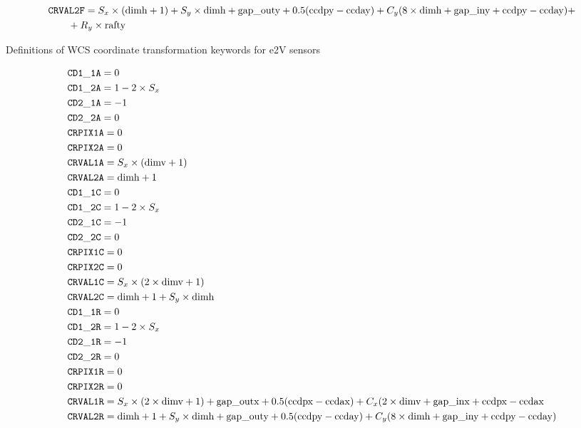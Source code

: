 \documentclass{article}[12pt]
\begin{document}
\begin{table}
\begin{align*}
& {\tt CRVAL2F} = S_x \times ({\rm dimh} + 1) + S_y \times {\rm dimh} +  {\rm gap\_outy} + 0.5({\rm ccdpy} -  {\rm ccday}) + C_y ( 8 \times {\rm dimh} + {\rm gap\_iny} + {\rm ccdpy} - {\rm ccday}) + \\  &\qquad {} + R_y \times {\rm rafty}  \\
\end{align*}
\caption{Definitions of WCS coordinate transformation keywords for e2V sensors\label{tab:e2vwcs}}
\end{table}

\begin{table}
\begin{align*}
& {\tt CD1\_1A} = 0 \\
& {\tt CD1\_2A} = 1 - 2 \times S_x \\
& {\tt CD2\_1A} = -1 \\
& {\tt CD2\_2A} = 0 \\
& {\tt CRPIX1A} = 0 \\
& {\tt CRPIX2A} = 0 \\
& {\tt CRVAL1A} = S_x \times({\rm dimv} + 1) \\
& {\tt CRVAL2A} = {\rm dimh} + 1 \\
& {\tt CD1\_1C} = 0 \\
& {\tt CD1\_2C} = 1 - 2 \times S_x \\
& {\tt CD2\_1C} = -1 \\
& {\tt CD2\_2C} = 0 \\
& {\tt CRPIX1C} = 0 \\
& {\tt CRPIX2C} = 0 \\
& {\tt CRVAL1C} = S_x \times(2 \times {\rm dimv} + 1) \\
& {\tt CRVAL2C} = {\rm dimh} + 1 + S_y \times {\rm dimh} \\
& {\tt CD1\_1R} = 0 \\
& {\tt CD1\_2R} = 1 - 2 \times S_x \\
& {\tt CD2\_1R} = -1 \\
& {\tt CD2\_2R} = 0 \\
& {\tt CRPIX1R} = 0 \\
& {\tt CRPIX2R} = 0 \\
& {\tt CRVAL1R} = S_x \times(2 \times {\rm dimv} + 1) + {\rm gap\_outx} + 0.5({\rm ccdpx} - {\rm ccdax}) + C_x(2 \times {\rm dimv} + {\rm gap\_inx} + {\rm ccdpx} - {\rm ccdax} \\
& {\tt CRVAL2R} = {\rm dimh} + 1 + S_y \times {\rm dimh} + {\rm gap\_outy} + 0.5({\rm ccdpy} - {\rm ccday}) + C_y ( 8 \times {\rm dimh} + {\rm gap\_iny} + {\rm ccdpy} - {\rm ccday}) \\

\end{align*}
\end{table}
\end{document}

